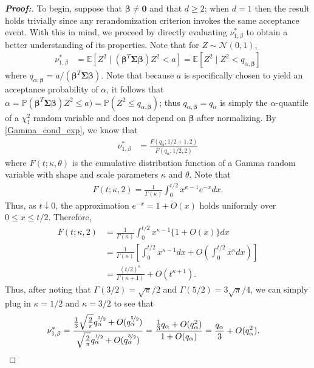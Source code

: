 \documentclass[11pt,twoside]{article}
\theoremstyle{definition}
\theoremstyle{remark}
\begin{document}
\begin{proof}[\textbf{Proof:}] To begin, suppose that $\bm{\beta} \neq \mathbf{0}$ and that $d \geq 2$; when $d = 1$ then the result holds trivially since any rerandomization criterion invokes the same acceptance event. With this in mind, we proceed by directly evaluating $\nu^*_{1, \beta }$ to obtain a better understanding of its properties. Note that for $Z \sim \mathcal{N}(0, 1)$,
\begin{align*}
    \nu^*_{1, \beta } &= \mathbb{E}\left[Z^2 \mid (\bm{\beta}^T \mathbf{\Sigma} \bm{\beta}) Z^2 < a \right] = \mathbb{E}\left[Z^2 \mid  Z^2 < q_{\alpha, \bm{\beta}} \right]
\end{align*}
where $q_{\alpha, \bm{\beta}} = a / (\bm{\beta}^T \mathbf{\Sigma} \bm{\beta})$. Note that because $a$ is specifically chosen to yield an acceptance probability of $\alpha$, it follows that $\alpha = \mathbb{P}( \bm{\beta}^T \mathbf{\Sigma} \bm{\beta}) Z^2 \leq a) = \mathbb{P}( Z^2 \leq q_{\alpha, \bm{\beta}})$; thus $q_{\alpha, \bm{\beta}} = q_{\alpha}$ is simply the $\alpha$-quantile of a $\chi^2_1$ random variable and does not depend on $\bm{\beta}$ after normalizing. By \cref{Gamma_cond_exp}, we know that 
\begin{align*}
    \nu^*_{1, \beta } &= \frac{F(q_{\alpha}; 1/2 + 1, 2)}{F(q_{\alpha}; 1/2, 2)}
    \end{align*}
    where $F(t; \kappa, \theta)$ is the cumulative distribution function of a Gamma random variable with shape and scale parameters $\kappa$ and $\theta$. Note that
\begin{align*}
    F(t;\kappa,2) = \frac{1}{\Gamma(\kappa)} \int_0^{t/2}x^{\kappa-1}e^{-x}dx.
\end{align*}
Thus, as $t\downarrow0$, the approximation $e^{-x}=1+O(x)$ holds uniformly over $0\leq x\leq t/2$. Therefore,
\begin{align*}
    F(t;\kappa,2) &= \frac{1}{\Gamma(\kappa)} \int_0^{t/2} x^{\kappa-1}\{1+O(x)\}dx \\
    &= \frac{1}{\Gamma(\kappa)} \left[ \int_0^{t/2}x^{\kappa-1}dx + O\!\left( \int_0^{t/2}x^\kappa dx\right) \right] \\
    &= \frac{(t/2)^\kappa}{\Gamma(\kappa+1)} + O(t^{\kappa+1}).
\end{align*}
Thus, after noting that $\Gamma(3/2)=\sqrt{\pi}/2$ and $\Gamma(5/2)=3\sqrt{\pi}/4$, we can simply plug in $\kappa = 1/2$ and $\kappa = 3/2$ to see that 
\begin{align*}
    \nu^*_{1,\beta} &= \frac{ \frac{1}{3} \sqrt{\frac{2}{\pi}} q_\alpha^{\nicefrac{3}{2}} + O(q_\alpha^{\nicefrac{5}{2}})}{ \sqrt{\frac{2}{\pi}} q_\alpha^{\nicefrac{1}{2}} + O(q_\alpha^{\nicefrac{3}{2}})} = \frac{\frac{1}{3}q_\alpha + O(q_\alpha^2) }{ 1+O(q_\alpha) } = \frac{q_\alpha}{3} + O(q_\alpha^2).

\end{align*}
\end{proof}
\end{document}
